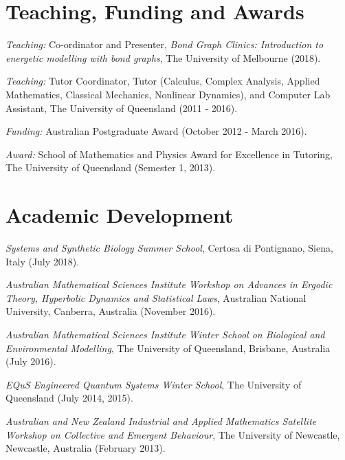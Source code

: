 \documentclass[letterpaper]{article}
\renewenvironment{itemize}{
  \begin{list}{}{
    \setlength{\leftmargin}{1.5em}
  }
}{
  \end{list}
}
\begin{document}
\section*{Teaching, Funding and Awards}
\begin{itemize}
	\item \emph{Teaching:} Co-ordinator and Presenter, {\em Bond Graph Clinics: Introduction to energetic modelling with bond graphs}, The University of Melbourne (2018).
	\item \emph{Teaching:} Tutor Coordinator, Tutor (Calculus, Complex Analysis, Applied Mathematics, Classical Mechanics, Nonlinear Dynamics), and Computer Lab Assistant, The University of Queensland (2011 - 2016).
	\item \emph{Funding:} Australian Postgraduate Award (October 2012 - March 2016).
	\item \emph{Award:} School of Mathematics and Physics Award for Excellence in Tutoring, The University of Queensland (Semester 1, 2013).
\end{itemize}

\section*{Academic Development}
\begin{itemize}
	\item \emph{Systems and Synthetic Biology Summer School}, Certosa di Pontignano, Siena, Italy (July 2018).
	\item \emph{Australian Mathematical Sciences Institute Workshop on Advances in Ergodic Theory, Hyperbolic Dynamics and Statistical Laws}, Australian National University, Canberra, Australia (November 2016).
	\item \emph{Australian Mathematical Sciences Institute Winter School on Biological and Environmental Modelling}, The University of Queensland, Brisbane, Australia (July 2016).
	\item \emph{EQuS Engineered Quantum Systems Winter School}, The University of Queensland (July 2014, 2015).
	\item \emph{Australian and New Zealand Industrial and Applied Mathematics Satellite Workshop on Collective and Emergent Behaviour}, The University of Newcastle, Newcastle, Australia (February 2013).
\end{itemize}
\end{document}
